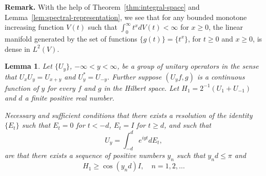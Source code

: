 \documentclass{article}
\newtheorem{lemma}{Lemma}
\begin{document}
\textbf{Remark.} With the help of Theorem~\ref{thm:integral-space} and Lemma~\ref{lem:spectral-representation}, we see that for any bounded monotone increasing function $V(t)$ such that $\int_0^{\infty} t^x dV(t) < \infty$ for $x \geq 0$, the linear manifold generated by the set of functions $\{g(t)\} = \{t^x\}$, for $t \geq 0$ and $x \geq 0$, is dense in $L^2(V)$.

\begin{lemma}
\label{lem:unitary-group}
Let $\{U_y\}$, $-\infty < y < \infty$, be a group of unitary operators in the sense that $U_x U_y = U_{x+y}$ and $U_y^* = U_{-y}$. Further suppose $(U_y f, g)$ is a continuous function of $y$ for every $f$ and $g$ in the Hilbert space. Let $H_1 = 2^{-1}(U_1 + U_{-1})$ and $d$ a finite positive real number.

Necessary and sufficient conditions that there exists a resolution of the identity $\{E_t\}$ such that $E_t = 0$ for $t < -d$, $E_t = I$ for $t \geq d$, and such that
\begin{equation}
U_y = \int_{-d}^d e^{iyt} dE_t,
\label{eq:unitary-representation}
\end{equation}
are that there exists a sequence of positive numbers $y_n$ such that $y_n d \leq \pi$ and
\begin{equation}
H_1 \geq \cos(y_n d) I, \quad n = 1, 2, \ldots
\label{eq:cosine-bound}
\end{equation}
\end{lemma}
\end{document}
